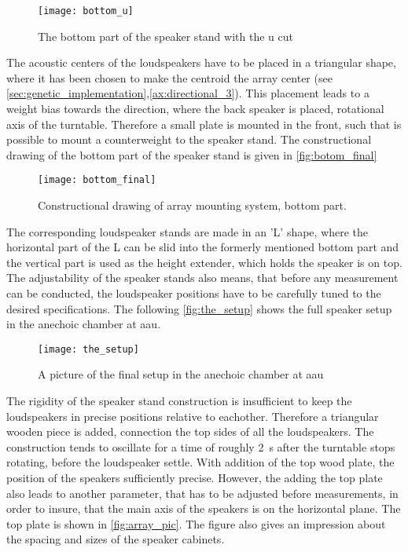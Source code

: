  \begin{figure}[H]
	\centering
	\texttt{[image: bottom\_u]}
	\caption{The bottom part of the speaker stand with the u cut}
		\label{fig:botom_u}
\end{figure}

The acoustic centers of the loudspeakers have to be placed in a triangular shape, where it has been chosen to make the centroid the array center (see \autoref{sec:genetic_implementation},\autoref{ax:directional_3}). This placement leads to a weight bias towards the direction, where the back speaker is placed, rotational axis of the turntable. Therefore a small plate is mounted in the front, such that is possible to mount a counterweight to the speaker stand. The constructional drawing of the bottom part of the speaker stand is given in \autoref{fig:botom_final}

\begin{figure}[H]
	\centering
	\texttt{[image: bottom\_final]}
	\caption{Constructional drawing of array mounting system, bottom part.}
		\label{fig:botom_final}
\end{figure}

The corresponding loudspeaker stands are made in an 'L' shape, where the horizontal part of the L can be slid into the formerly mentioned bottom part and the vertical part is used as the height extender, which holds the speaker is on top. The adjustability of the speaker stands also means, that before any measurement can be conducted, the loudspeaker positions have to be carefully tuned to the desired specifications. The following \autoref{fig:the_setup} shows the full speaker setup in the anechoic chamber at \gls{aau}.

  \begin{figure}[H]
	\centering
	\texttt{[image: the\_setup]}
	\caption{A picture of the final setup in the anechoic chamber at \gls{aau}}
		\label{fig:the_setup}
\end{figure}

The rigidity of the speaker stand construction is insufficient to keep the loudspeakers in precise positions relative to eachother. Therefore a triangular wooden piece is added, connection the top sides of all the loudspeakers. The construction tends to oscillate for a time of roughly \SI{2}{\second} after the turntable stops rotating, before the loudspeaker settle. With addition of the top wood plate, the position of the speakers sufficiently precise. However, the adding the top plate also leads to another parameter, that has to be adjusted before measurements, in order to insure, that the main axis of the speakers is on the horizontal plane. 
The top plate is shown in \autoref{fig:array_pic}. The figure also gives an impression about the spacing and sizes of the speaker cabinets.

